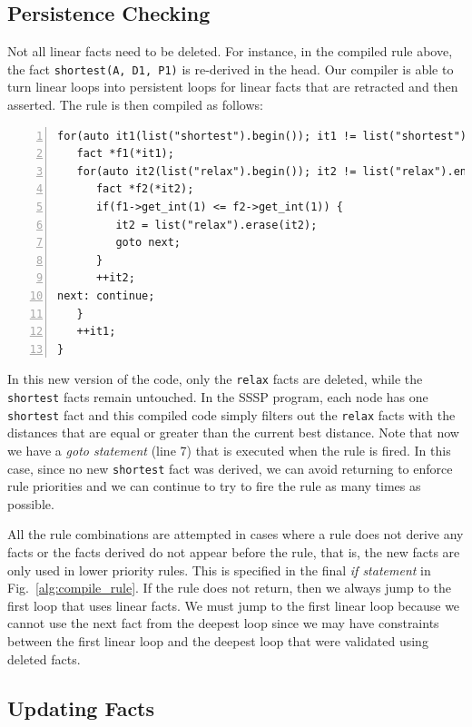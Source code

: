 \subsection{Persistence Checking}

Not all linear facts need to be deleted. For instance, in the compiled rule
above, the fact \texttt{shortest(A, D1, P1)} is re-derived in the head. Our
compiler is able to turn linear loops into persistent loops for linear facts
that are retracted and then asserted.  The rule is then compiled as follows:

\begin{Verbatim}[numbers=left,fontsize=\scriptsize,xleftmargin=\codemargin]
for(auto it1(list("shortest").begin()); it1 != list("shortest").end(); ) {
   fact *f1(*it1);
   for(auto it2(list("relax").begin()); it2 != list("relax").end(); ) {
      fact *f2(*it2);
      if(f1->get_int(1) <= f2->get_int(1)) {
         it2 = list("relax").erase(it2);
         goto next;
      }
      ++it2;
next: continue;
   }
   ++it1;
}
\end{Verbatim}

In this new version of the code, only the \texttt{relax} facts are deleted,
while the \texttt{shortest} facts remain untouched. In the SSSP program, each
node has one \texttt{shortest} fact and this compiled code simply filters out
the \texttt{relax} facts with the distances that are equal or greater than the
current best distance. Note that now we have a \emph{goto statement} (line 7)
that is executed when the rule is fired.  In this case, since no new
\texttt{shortest} fact was derived, we can avoid returning to enforce rule
priorities and we can continue to try to fire the rule as many times as
possible.

All the rule combinations are attempted in cases where a rule does not derive
any facts or the facts derived do not appear before the rule, that is, the new
facts are only used in lower priority rules. This is specified in the final
\emph{if statement} in Fig.~\ref{alg:compile_rule}. If the rule does not return,
then we always jump to the first loop that uses linear facts. We must jump to
the first linear loop because we cannot use the next fact from the deepest loop
since we may have constraints between the first linear loop and the deepest loop
that were validated using deleted facts.

\subsection{Updating Facts}


